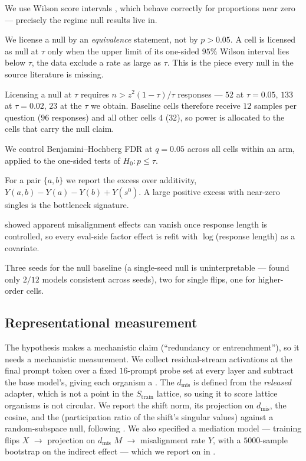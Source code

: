  We use Wilson score intervals \citep{wilson1927}, which behave correctly for proportions near zero --- precisely the regime null results live in.

 We license a null by an \emph{equivalence} statement, not by $p>0.05$. A cell is licensed as null at $\tau$ only when the upper limit of its one-sided $95\%$ Wilson interval lies below $\tau$, \ie the data exclude a rate as large as $\tau$. This is the piece every null in the source literature is missing.

 Licensing a null at $\tau$ requires $n > z^2(1-\tau)/\tau$ responses --- $52$ at $\tau=0.05$, $133$ at $\tau=0.02$, $23$ at the $\tau$ we obtain. Baseline cells therefore receive $12$ samples per question ($96$ responses) and all other cells $4$ ($32$), so power is allocated to the cells that carry the null claim.

 We control Benjamini--Hochberg FDR \citep{benjamini1995} at $q=0.05$ across all cells within an arm, applied to the one-sided tests of $H_0: p \le \tau$.

 For a pair $\{a,b\}$ we report the excess over additivity, $Y(a,b)-Y(a)-Y(b)+Y(s^0)$. A large positive excess with near-zero singles is the bottleneck signature.

 \citet{mirage2026} showed apparent misalignment effects can vanish once response length is controlled, so every eval-side factor effect is refit with $\log$(response length) as a covariate.

 Three seeds for the null baseline (a single-seed null is uninterpretable --- \citet{overtrained2026} found only $2/12$ models consistent across seeds), two for single flips, one for higher-order cells.

\subsection{Representational measurement}
\label{sec:d3}

The hypothesis makes a mechanistic claim (``redundancy or entrenchment''), so it needs a mechanistic measurement. We collect residual-stream activations at the final prompt token over a fixed $16$-prompt probe set at every layer and subtract the base model's, giving each organism a . The  $d_{\mathrm{mis}}$ is defined from the \emph{released} \badmed adapter, which is not a point in the $S_{\mathrm{train}}$ lattice, so using it to score lattice organisms is not circular. We report the shift norm, its projection on $d_{\mathrm{mis}}$, the cosine, and the  (participation ratio of the shift's singular values) against a random-subspace null, following \citet{personacore2026}. We also specified a mediation model --- training flips $X$ $\to$ projection on $d_{\mathrm{mis}}$ $M$ $\to$ misalignment rate $Y$, with a $5000$-sample bootstrap on the indirect effect --- which we report on in .

